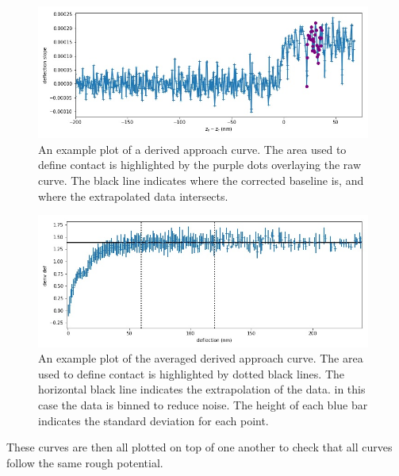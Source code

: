 \begin{figure}[h!]    
        \begin{center}
          \includegraphics[width=110mm]{chapter4/EgInduDeriv.jpg}
\end{center}
\caption{An example plot of a derived approach curve. The area used to define contact is highlighted by the purple dots overlaying the raw curve. The black line indicates where the corrected baseline is, and where the extrapolated data intersects.}
\label{fig:EgInduDeriv}                
\end{figure}

\begin{figure}[h!]    
        \begin{center}
          \includegraphics[width=110mm]{chapter4/EgAvgDeriv.jpg}
\end{center}
\caption{An example plot of the averaged derived approach curve. The area used to define contact is highlighted by dotted black lines. The horizontal black line indicates the extrapolation of the data. in this case the data is binned to reduce noise. The height of each blue bar indicates the standard deviation for each point.}
\label{fig:EgAvgDeriv}                
\end{figure}

\newpage

These curves are then all plotted on top of one another to check that all curves follow the same rough potential.

